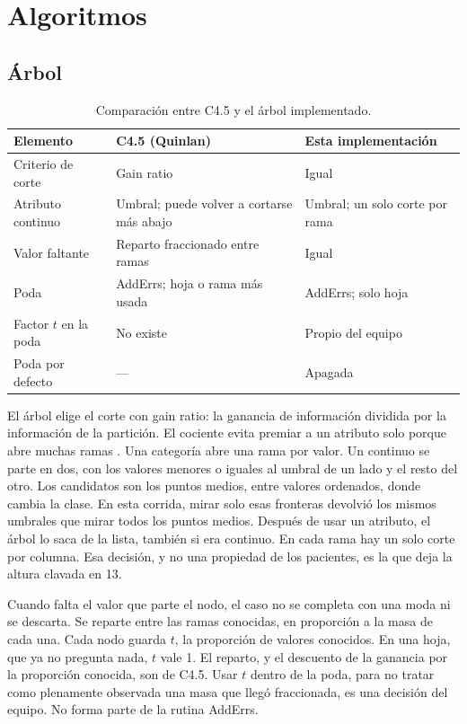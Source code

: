\documentclass{llncs}
\begin{document}
\section{Algoritmos}
\label{sec:algoritmos}

\subsection{Árbol}

\begin{table}[ht]
\centering
\caption{Comparación entre C4.5 y el árbol implementado.}
\label{tab:c45}
\begin{tabular}{p{2.8cm}p{4.3cm}p{4.3cm}}
\toprule
Elemento & C4.5 (Quinlan) & Esta implementación \\
\midrule
Criterio de corte & Gain ratio & Igual \\
Atributo continuo & Umbral; puede volver a cortarse más abajo & Umbral; un solo corte por rama \\
Valor faltante & Reparto fraccionado entre ramas & Igual \\
Poda & AddErrs; hoja o rama más usada & AddErrs; solo hoja \\
Factor \(t\) en la poda & No existe & Propio del equipo \\
Poda por defecto & --- & Apagada \\
\bottomrule
\end{tabular}
\end{table}

El árbol elige el corte con gain ratio: la ganancia de información dividida por la información de la partición. El cociente evita premiar a un atributo solo porque abre muchas ramas \cite[p.~67]{liu2011}. Una categoría abre una rama por valor. Un continuo se parte en dos, con los valores menores o iguales al umbral de un lado y el resto del otro. Los candidatos son los puntos medios, entre valores ordenados, donde cambia la clase. En esta corrida, mirar solo esas fronteras devolvió los mismos umbrales que mirar todos los puntos medios. Después de usar un atributo, el árbol lo saca de la lista, también si era continuo. En cada rama hay un solo corte por columna. Esa decisión, y no una propiedad de los pacientes, es la que deja la altura clavada en 13.

Cuando falta el valor que parte el nodo, el caso no se completa con una moda ni se descarta. Se reparte entre las ramas conocidas, en proporción a la masa de cada una. Cada nodo guarda \(t\), la proporción de valores conocidos. En una hoja, que ya no pregunta nada, \(t\) vale 1. El reparto, y el descuento de la ganancia por la proporción conocida, son de C4.5. Usar \(t\) dentro de la poda, para no tratar como plenamente observada una masa que llegó fraccionada, es una decisión del equipo. No forma parte de la rutina AddErrs.
\end{document}
